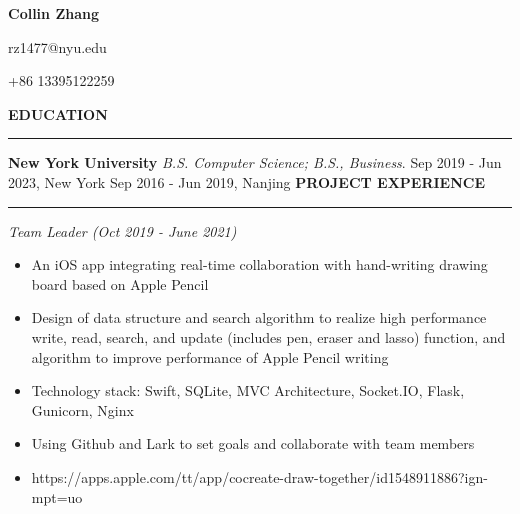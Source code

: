 \documentclass{article}
\begin{document}
\begin{center}
{\huge \textbf{Collin Zhang}}\par
rz1477@nyu.edu\par+86 13395122259
\end{center}

\noindent
{\textbf{EDUCATION}}\newline
\rule{\textwidth}{1pt}\newline
{\textbf {New York University}}\newline
\emph {B.S. Computer Science; B.S., Business}.\newline
{Sep 2019 - Jun 2023, New York}\newline
{}\newline
{Sep 2016 - Jun 2019, Nanjing}\newline
\newline
\noindent
{\textbf{PROJECT EXPERIENCE}}\newline
\rule{\textwidth}{1pt}\newline
\emph{Team Leader (Oct 2019 - June 2021)}
\begin{itemize}[leftmargin=*]
\item An iOS app integrating real-time collaboration with hand-writing drawing board based on Apple Pencil
\item Design of data structure and search algorithm to realize high performance write, read, search, and update (includes pen, eraser and lasso) function, and algorithm to improve performance of Apple Pencil writing
\item Technology stack: Swift, SQLite, MVC Architecture, Socket.IO, Flask, Gunicorn, Nginx
\item Using Github and Lark to set goals and collaborate with team members
\item https://apps.apple.com/tt/app/cocreate-draw-together/id1548911886?ign-mpt=uo%

\end{itemize}
\end{document}
